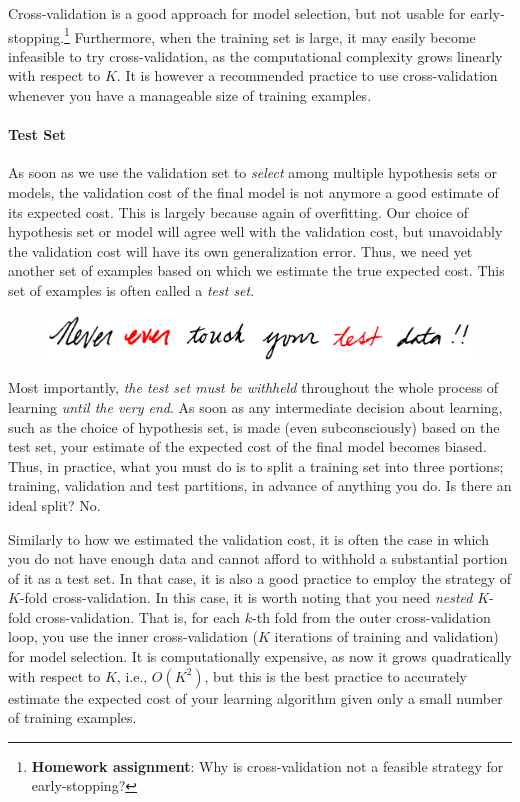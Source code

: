 \documentclass{report}
\begin{document}
Cross-validation is a good approach for model selection, but not usable for
early-stopping.\footnote{
    {\bf Homework assignment}: Why is cross-validation not a feasible strategy
    for early-stopping? 
} Furthermore, when the training set is large, it may easily become infeasible
to try cross-validation, as the computational complexity grows linearly with
respect to $K$. It is however a recommended practice to use cross-validation
whenever you have a manageable size of training examples.

\paragraph{Test Set}

As soon as we use the validation set to {\it select} among multiple hypothesis
sets or models, the validation cost of the final model is not anymore a good
estimate of its expected cost. This is largely because again of overfitting. Our
choice of hypothesis set or model will agree well with the validation cost, but
unavoidably the validation cost will have its own generalization error. Thus, we
need yet another set of examples based on which we estimate the true expected
cost. This set of examples is often called a {\it test set}. 

\begin{figure}[t]
    \centering
    \includegraphics[width=0.8\columnwidth]{figures/neverever.png}
\end{figure}

Most importantly, {\it the test set must be withheld} throughout the whole
process of learning {\it until the very end}.  As soon as any intermediate
decision about learning, such as the choice of hypothesis set, is made (even
subconsciously) based on the test set, your estimate of the expected cost of the
final model becomes biased. Thus, in practice, what you must do is to split a
training set into three portions; training, validation and test partitions, in
advance of anything you do. Is there an ideal split? No.

Similarly to how we estimated the validation cost, it is often the case in which
you do not have enough data and cannot afford to withhold a substantial portion
of it as a test set. In that case, it is also a good practice to employ the
strategy of $K$-fold cross-validation. In this case, it is worth noting that you
need {\it nested} $K$-fold cross-validation. That is, for each $k$-th fold from
the outer cross-validation loop, you use the inner cross-validation ($K$
iterations of training and validation) for model selection. It is
computationally expensive, as now it grows quadratically with respect to $K$,
i.e., $O(K^2)$, but this is the best practice to accurately estimate the
expected cost of your learning algorithm given only a small number of training
examples. 
\end{document}
